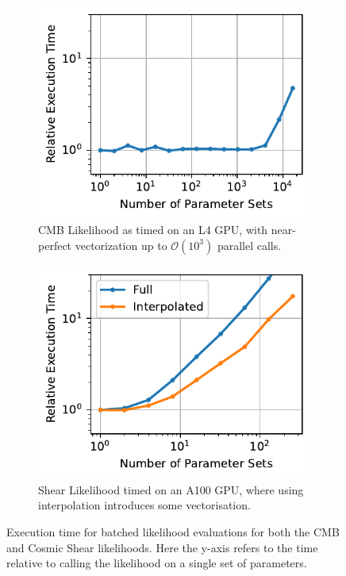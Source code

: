 \documentclass[twocolumn]{openjournal}
\begin{document}
\begin{figure}[ht]
    \centering %
    \begin{subfigure}[b]{0.48\textwidth}
        \centering
        \includegraphics{cmbscaling.pdf}
        \caption{CMB Likelihood as timed on an L4 GPU, with near-perfect vectorization up to $\mathcal{O}(10^3)$ parallel calls.}
        \label{fig:cmb_scaling}
    \end{subfigure}
    \hfill %
    \begin{subfigure}[b]{0.48\textwidth}
        \centering
        \includegraphics{shearscaling.pdf} 
        \caption{Shear Likelihood timed on an A100 GPU, where using interpolation introduces some vectorisation.}
        \label{fig:shear_scaling}
    \end{subfigure}
    \caption{Execution time for batched likelihood evaluations for both the CMB and Cosmic Shear likelihoods. Here the y-axis refers to the time relative to calling the likelihood on a single set of parameters.}
    \label{fig:likelihood_scaling}
\end{figure}
\end{document}
